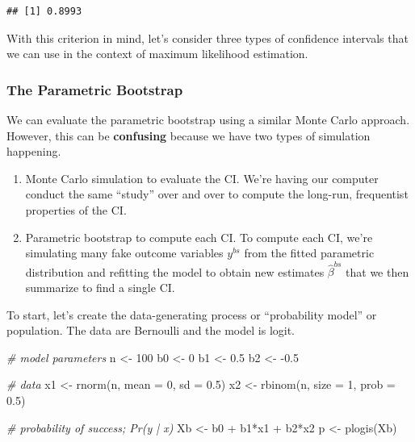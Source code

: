 \documentclass[
]{book}
\newenvironment{Shaded}{\begin{snugshade}}{\end{snugshade}}
\newcommand{\AttributeTok}[1]{\textcolor[rgb]{0.77,0.63,0.00}{#1}}
\newcommand{\CommentTok}[1]{\textcolor[rgb]{0.56,0.35,0.01}{\textit{#1}}}
\newcommand{\DecValTok}[1]{\textcolor[rgb]{0.00,0.00,0.81}{#1}}
\newcommand{\FloatTok}[1]{\textcolor[rgb]{0.00,0.00,0.81}{#1}}
\newcommand{\FunctionTok}[1]{\textcolor[rgb]{0.00,0.00,0.00}{#1}}
\newcommand{\NormalTok}[1]{#1}
\newcommand{\OtherTok}[1]{\textcolor[rgb]{0.56,0.35,0.01}{#1}}
\newcommand{\SpecialCharTok}[1]{\textcolor[rgb]{0.00,0.00,0.00}{#1}}
\providecommand{\tightlist}{%
  \setlength{\itemsep}{0pt}\setlength{\parskip}{0pt}}
\begin{document}
\begin{verbatim}
## [1] 0.8993
\end{verbatim}

With this criterion in mind, let's consider three types of confidence intervals that we can use in the context of maximum likelihood estimation.

\hypertarget{the-parametric-bootstrap-2}{%
\subsubsection{The Parametric Bootstrap}\label{the-parametric-bootstrap-2}}

We can evaluate the parametric bootstrap using a similar Monte Carlo approach. However, this can be \textbf{confusing} because we have two types of simulation happening.

\begin{enumerate}
\def\labelenumi{\arabic{enumi}.}
\tightlist
\item
  Monte Carlo simulation to evaluate the CI. We're having our computer conduct the same ``study'' over and over to compute the long-run, frequentist properties of the CI.
\item
  Parametric bootstrap to compute each CI. To compute each CI, we're simulating many fake outcome variables \(y^{bs}\) from the fitted parametric distribution and refitting the model to obtain new estimates \(\hat{\beta}^{bs}\) that we then summarize to find a single CI.
\end{enumerate}

To start, let's create the data-generating process or ``probability model'' or population. The data are Bernoulli and the model is logit.

\begin{Shaded}
\begin{Highlighting}[]
\CommentTok{\# model parameters}
\NormalTok{n }\OtherTok{\textless{}{-}} \DecValTok{100}
\NormalTok{b0 }\OtherTok{\textless{}{-}} \DecValTok{0}
\NormalTok{b1 }\OtherTok{\textless{}{-}} \FloatTok{0.5}
\NormalTok{b2 }\OtherTok{\textless{}{-}} \SpecialCharTok{{-}}\FloatTok{0.5}

\CommentTok{\# data}
\NormalTok{x1 }\OtherTok{\textless{}{-}} \FunctionTok{rnorm}\NormalTok{(n, }\AttributeTok{mean =} \DecValTok{0}\NormalTok{, }\AttributeTok{sd =} \FloatTok{0.5}\NormalTok{)}
\NormalTok{x2 }\OtherTok{\textless{}{-}} \FunctionTok{rbinom}\NormalTok{(n, }\AttributeTok{size =} \DecValTok{1}\NormalTok{, }\AttributeTok{prob =} \FloatTok{0.5}\NormalTok{)}

\CommentTok{\# probability of success; Pr(y | x)}
\NormalTok{Xb }\OtherTok{\textless{}{-}}\NormalTok{ b0 }\SpecialCharTok{+}\NormalTok{ b1}\SpecialCharTok{*}\NormalTok{x1 }\SpecialCharTok{+}\NormalTok{ b2}\SpecialCharTok{*}\NormalTok{x2}
\NormalTok{p }\OtherTok{\textless{}{-}} \FunctionTok{plogis}\NormalTok{(Xb)}
\end{Highlighting}
\end{Shaded}
\end{document}
